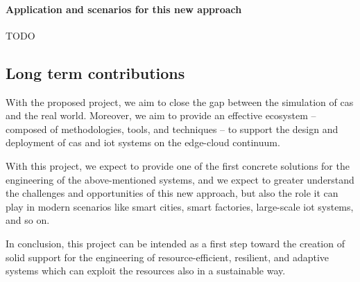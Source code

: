 \documentclass[12pt]{article}
\newcommand{\meta}[1]{{\color{blue}#1}}
\begin{document}
\paragraph{Application and scenarios for this new approach}
\meta{TODO}

\subsection{Long term contributions}
With the proposed project, we aim to close the gap between the simulation of \ac{cas} and the real world.
%
Moreover, we aim to provide an effective ecosystem -- composed of methodologies, tools, and techniques --
to support the design and deployment of \ac{cas} and \ac{iot} systems on the edge-cloud continuum.

With this project,
we expect to provide one of the first concrete solutions for the engineering of the above-mentioned systems,
and we expect to greater understand the challenges and opportunities of this new approach,
but also the role it can play in modern scenarios like smart cities, smart factories, large-scale \ac{iot} systems, and so on.

In conclusion,
this project can be intended as a first step toward the creation of solid support
for the engineering of resource-efficient, resilient, and adaptive systems
which can exploit the resources also in a sustainable way.
\end{document}
